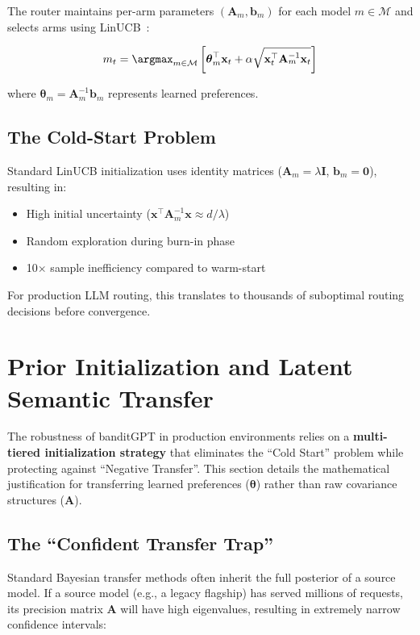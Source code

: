 \documentclass[sigconf]{acmart}
\begin{document}
The router maintains per-arm parameters $(\mathbf{A}_m, \mathbf{b}_m)$ for each model $m \in \mathcal{M}$ and selects arms using LinUCB~\cite{li2010contextual}:

\begin{equation}
m_t = \argmax_{m \in \mathcal{M}} \left[ \boldsymbol{\theta}_m^\top \mathbf{x}_t + \alpha \sqrt{\mathbf{x}_t^\top \mathbf{A}_m^{-1} \mathbf{x}_t} \right]
\label{eq:linucb}
\end{equation}

where $\boldsymbol{\theta}_m = \mathbf{A}_m^{-1} \mathbf{b}_m$ represents learned preferences.

\subsection{The Cold-Start Problem}

Standard LinUCB initialization uses identity matrices ($\mathbf{A}_m = \lambda \mathbf{I}$, $\mathbf{b}_m = \mathbf{0}$), resulting in:
\begin{itemize}
    \item High initial uncertainty ($\mathbf{x}^\top \mathbf{A}_m^{-1} \mathbf{x} \approx d/\lambda$)
    \item Random exploration during burn-in phase
    \item 10$\times$ sample inefficiency compared to warm-start
\end{itemize}

For production LLM routing, this translates to thousands of suboptimal routing decisions before convergence.

\section{Prior Initialization and Latent Semantic Transfer}

The robustness of banditGPT in production environments relies on a \textbf{multi-tiered initialization strategy} that eliminates the ``Cold Start'' problem while protecting against ``Negative Transfer''. This section details the mathematical justification for transferring learned preferences ($\boldsymbol{\theta}$) rather than raw covariance structures ($\mathbf{A}$).

\subsection{The ``Confident Transfer Trap''}

Standard Bayesian transfer methods often inherit the full posterior of a source model. If a source model (e.g., a legacy flagship) has served millions of requests, its precision matrix $\mathbf{A}$ will have high eigenvalues, resulting in extremely narrow confidence intervals:
\end{document}
